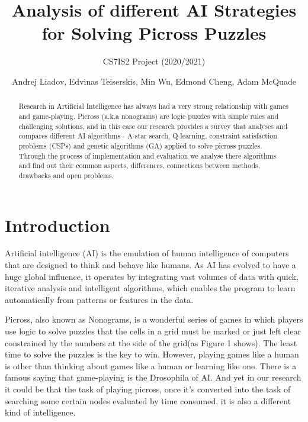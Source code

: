 \documentclass{svproc}
\begin{document}
\mainmatter
\title{Analysis of different AI Strategies for Solving Picross Puzzles}
\subtitle{CS7IS2 Project (2020/2021)}
\author{Andrej Liadov, Edvinas Teiserskis, Min Wu, Edmond Cheng, Adam McQuade}

\maketitle              %


\begin{abstract}
Research in Artificial Intelligence has always had a very strong relationship with games and game-playing. Picross (a.k.a nonograms) are logic puzzles with simple rules and challenging solutions, and in this case our research provides a survey that analyses and compares different AI algorithms - A-star search, Q-learning, constraint satisfaction problems (CSPs) and genetic algorithms (GA) applied to solve picross puzzles. Through the process of implementation and evaluation we analyse there algorithms and find out their common aspects, differences, connections between methods, drawbacks and open problems.
\end{abstract}


\section{Introduction}
Artificial intelligence (AI) is the emulation of human intelligence of computers that are designed to think and behave like humans. As AI has evolved to have a huge global influence, it operates by integrating vast volumes of data with quick, iterative analysis and intelligent algorithms, which enables the program to learn automatically from patterns or features in the data.

Picross, also known as Nonograms, is a wonderful series of games in which players use logic to solve puzzles that the cells in a grid must be marked or just left clear constrained by the numbers at the side of the grid(as Figure 1 shows). The least time to solve the puzzles is the key to win. However, playing games like a human is other than thinking about games like a human or learning like one. There is a famous saying that game-playing is the Drosophila of AI. And yet in our research it could be that the task of playing picross, once it’s converted into the task of searching some certain nodes evaluated by time consumed, it is also a different kind of intelligence.
\end{document}
